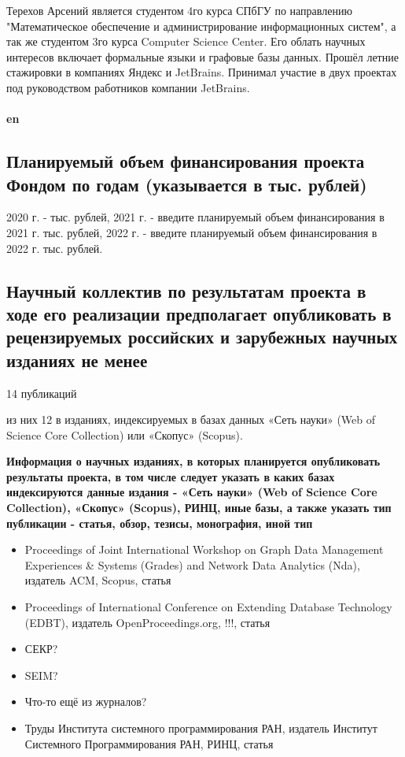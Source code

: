 \documentclass[12pt]{article}  %
\theoremstyle{remark}
\begin{document}
Терехов Арсений является студентом 4го курса СПбГУ по направлению "Математическое обеспечение и администрирование информационных
систем", а так же студентом 3го курса Computer Science Center. Его облать научных интересов включает формальные языки и графовые базы данных.
Прошёл летние стажировки в компаниях Яндекс и JetBrains. Принимал участие в двух проектах под руководством работников
компании JetBrains.
\\
\\
\textbf{en}


\subsection{Планируемый объем финансирования проекта Фондом по годам (указывается в тыс. рублей)}
2020 г. - тыс. рублей,
2021 г. - введите планируемый объем финансирования в 2021 г. тыс. рублей,
2022 г. - введите планируемый объем финансирования в 2022 г. тыс. рублей.

\subsection{Научный коллектив по результатам проекта в ходе его реализации предполагает опубликовать в рецензируемых российских и зарубежных научных изданиях не менее}

14 публикаций

из них 12 в изданиях, индексируемых в базах данных «Сеть науки» (Web of Science Core Collection) или «Скопус» (Scopus).

\textbf{Информация о научных изданиях, в которых планируется опубликовать результаты проекта, в том числе следует указать в каких базах индексируются данные издания - «Сеть науки» (Web of Science Core Collection), «Скопус» (Scopus), РИНЦ, иные базы, а также указать тип публикации - статья, обзор, тезисы, монография, иной тип}
\begin{itemize}
  \item Proceedings of Joint International Workshop on Graph Data Management Experiences \& Systems (Grades) and Network Data Analytics (Nda), издатель  ACM, Scopus, статья
  \item Proceedings of International Conference on Extending Database Technology (EDBT), издатель OpenProceedings.org, !!!, статья
  \item СЕКР?
  \item SEIM?
  \item Что-то ещё из журналов?
  \item Труды Института системного программирования РАН, издатель Институт Системного Программирования РАН, РИНЦ, статья
\end{itemize}
\end{document}

